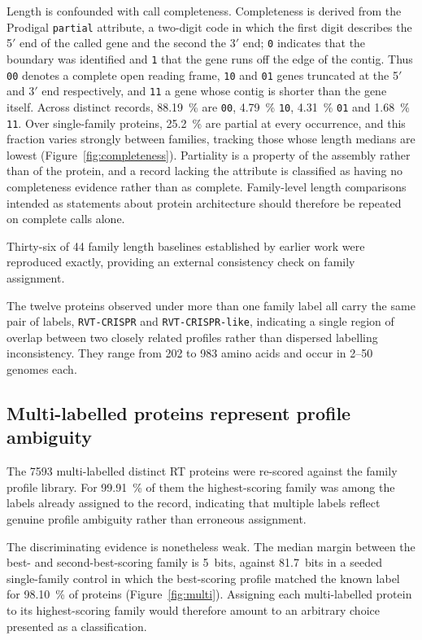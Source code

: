 Length is confounded with call completeness. Completeness is derived from the Prodigal
\texttt{partial} attribute, a two-digit code in which the first digit describes the 5$'$ end of the
called gene and the second the 3$'$ end; \texttt{0} indicates that the boundary was identified and
\texttt{1} that the gene runs off the edge of the contig. Thus \texttt{00} denotes a complete open
reading frame, \texttt{10} and \texttt{01} genes truncated at the 5$'$ and 3$'$ end respectively,
and \texttt{11} a gene whose contig is shorter than the gene itself. Across distinct records,
\SI{88.19}{\percent} are \texttt{00}, \SI{4.79}{\percent} \texttt{10}, \SI{4.31}{\percent}
\texttt{01} and \SI{1.68}{\percent} \texttt{11}. Over single-family proteins, \SI{25.2}{\percent}
are partial at every occurrence, and this fraction varies strongly between families, tracking those
whose length medians are lowest (Figure~\ref{fig:completeness}). Partiality is a property of the
assembly rather than of the protein, and a record lacking the attribute is classified as having no
completeness evidence rather than as complete. Family-level length comparisons intended as
statements about protein architecture should therefore be repeated on complete calls alone.

Thirty-six of 44 family length baselines established by earlier work were reproduced exactly,
providing an external consistency check on family assignment.

The twelve proteins observed under more than one family label all carry the same pair of labels,
\texttt{RVT-CRISPR} and \texttt{RVT-CRISPR-like}, indicating a single region of overlap between two
closely related profiles rather than dispersed labelling inconsistency. They range from 202 to 983
amino acids and occur in 2--50 genomes each.

\subsection{Multi-labelled proteins represent profile ambiguity}
\label{sec:dbchar:multi}

The \num{7593} multi-labelled distinct RT proteins were re-scored against the family profile
library. For \SI{99.91}{\percent} of them the highest-scoring family was among the labels already
assigned to the record, indicating that multiple labels reflect genuine profile ambiguity rather
than erroneous assignment.

The discriminating evidence is nonetheless weak. The median margin between the best- and
second-best-scoring family is 5~bits, against 81.7~bits in a seeded single-family control in which
the best-scoring profile matched the known label for \SI{98.10}{\percent} of proteins
(Figure~\ref{fig:multi}). Assigning each multi-labelled protein to its highest-scoring family would
therefore amount to an arbitrary choice presented as a classification.

